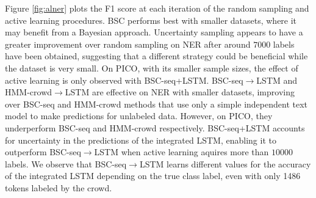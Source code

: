 
Figure \ref{fig:alner} plots the F1 score at each iteration 
of the random sampling and active learning procedures.
BSC performs best with smaller datasets, where it may benefit from a Bayesian approach. 
Uncertainty sampling appears to have a greater improvement over random sampling on NER
after around $7000$ labels have been obtained, suggesting that a different strategy could be beneficial while
the dataset is very small. On PICO, with its smaller sample sizes, the effect of active learning is only observed
with BSC-seq+LSTM.
BSC-seq$\rightarrow$LSTM and HMM-crowd$\rightarrow$LSTM are effective on NER with smaller datasets, improving over BSC-seq and HMM-crowd methods that 
use only a simple independent text model to make predictions for unlabeled data. 
However, on PICO, they underperform BSC-seq and HMM-crowd respectively. 
BSC-seq+LSTM accounts for uncertainty in the predictions of the integrated LSTM, 
enabling it to outperform BSC-seq$\rightarrow$LSTM when active learning aquires more than $10000$ labels.
We observe that
 BSC-seq$\rightarrow$LSTM learns different values for the accuracy of the integrated LSTM depending on the true class label, even with only 1486 tokens  labeled by the crowd.


